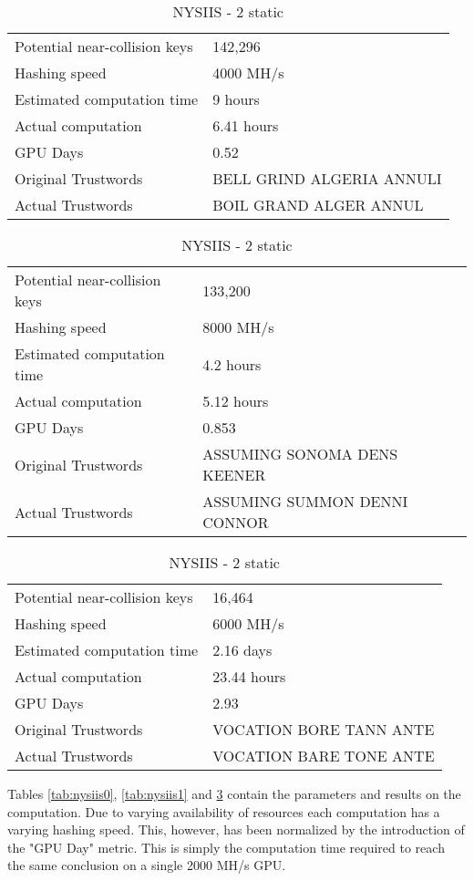 \begin{table}[h!]
    \begin{tabular}{|l|l|}
        \hline
        Potential near-collision keys & 142,296 \\
        Hashing speed & 4000 MH/s \\
        Estimated computation time & 9 hours \\
        Actual computation & 6.41 hours \\
        GPU Days & 0.52 \\
        \hline
        Original Trustwords & BELL GRIND ALGERIA ANNULI \\
        Actual Trustwords   & BOIL GRAND ALGER ANNUL \\
        \hline
    \end{tabular}
    \caption{NYSIIS - 0 static}
    \label{tab:nysiis0}

    \begin{tabular}{|l|l|}
        \hline
        Potential near-collision keys & 133,200 \\
        Hashing speed & 8000 MH/s \\
        Estimated computation time & 4.2 hours \\
        Actual computation & 5.12 hours \\
        GPU Days & 0.853 \\
        \hline
        Original Trustwords & ASSUMING SONOMA DENS KEENER \\
        Actual Trustwords   & ASSUMING SUMMON DENNI CONNOR \\
        \hline
    \end{tabular}
    \caption{NYSIIS - 1 static}
    \label{tab:nysiis1}

    \begin{tabular}{|l|l|}
        \hline
        Potential near-collision keys & 16,464 \\
        Hashing speed & 6000 MH/s \\
        Estimated computation time & 2.16 days \\
        Actual computation & 23.44 hours \\
        GPU Days & 2.93 \\
        \hline
        Original Trustwords & VOCATION BORE TANN ANTE \\
        Actual Trustwords   & VOCATION BARE TONE ANTE \\
        \hline
    \end{tabular}
    \caption{NYSIIS - 2 static}

    \label{tab:nysiis2}
\end{table}

Tables \ref{tab:nysiis0}, \ref{tab:nysiis1} and \ref{tab:nysiis2} contain the parameters and results on the computation. Due to varying availability of resources each computation has a varying hashing speed. This, however, has been normalized by the introduction of the "GPU Day" metric. This is simply the computation time required to reach the same conclusion on a single 2000 MH/s GPU.